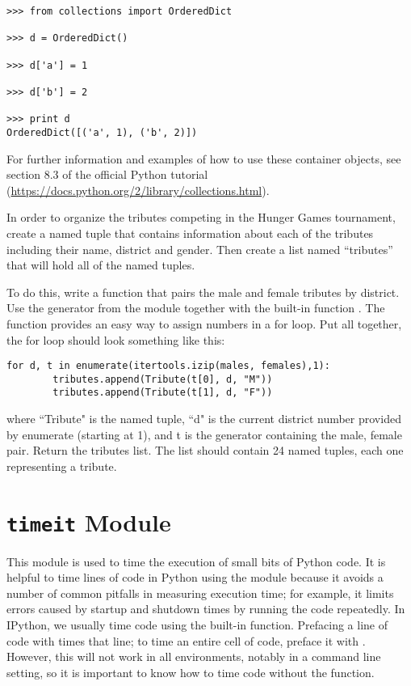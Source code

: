 \begin{lstlisting}
>>> from collections import OrderedDict

>>> d = OrderedDict()

>>> d['a'] = 1

>>> d['b'] = 2

>>> print d
OrderedDict([('a', 1), ('b', 2)])

\end{lstlisting}

For further information and examples of how to use these container objects, see section 8.3 of the official Python tutorial (\url{https://docs.python.org/2/library/collections.html}).

\begin{problem}
In order to organize the tributes competing in the Hunger Games tournament, create a named tuple that contains information about each of the tributes including their name, district and gender. Then create a list named ``tributes'' that will hold all of the named tuples.

To do this, write a function that pairs the male and female tributes by district. Use the  generator from the  module together with the built-in function . The  function provides an easy way to assign numbers in a for loop.
Put all together, the for loop should look something like this:

\begin{lstlisting}
for d, t in enumerate(itertools.izip(males, females),1):
        tributes.append(Tribute(t[0], d, "M"))
        tributes.append(Tribute(t[1], d, "F"))
\end{lstlisting}

where ``Tribute" is the named tuple, ``d" is the current district number provided by enumerate (starting at 1), and t is the  generator containing the male, female pair. Return the tributes list. The list should contain 24 named tuples, each one representing a tribute.
\label{prob:prob6}
\end{problem}


\section*{\texttt{timeit} Module}
This module is used to time the execution of small bits of Python code.
It is helpful to time lines of code in Python using the  module because it avoids a number of common pitfalls in measuring execution time; for example, it limits errors caused by startup and shutdown times by running the code repeatedly. In IPython, we usually time code using the built-in  function. Prefacing a line of code with  times that line; to time an entire cell of code, preface it with . However, this will not work in all environments, notably in a command line setting, so it is important to know how to time code without the  function.

